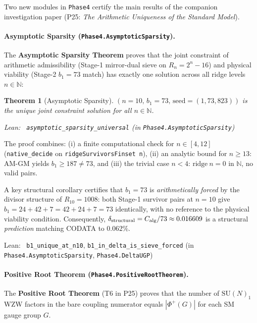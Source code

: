 \documentclass[11pt,a4paper]{article}
\newenvironment{leanref}%
  {\par\smallskip\noindent\begingroup\raggedright\textup{Lean:}~}%
  {\par\endgroup}
\newtheorem{theorem}{Theorem}[section]
\theoremstyle{definition}
\begin{document}
Two new modules in \texttt{Phase4} certify the main results of the
companion investigation paper (P25: \emph{The Arithmetic Uniqueness
of the Standard Model}).

\paragraph{Asymptotic Sparsity (\texttt{Phase4.AsymptoticSparsity}).}
The \textbf{Asymptotic Sparsity Theorem} proves that the joint constraint
of arithmetic admissibility (Stage-1 mirror-dual sieve on $R_n = 2^n - 16$)
and physical viability (Stage-2 $b_1 = 73$ match) has exactly one solution
across all ridge levels $n \in \mathbb{N}$:

\begin{theorem}[Asymptotic Sparsity]\label{thm:sparsity}
$(n{=}10,\, b_1{=}73,\, \mathrm{seed} = (1,73,823))$ is the unique joint
constraint solution for all $n \in \mathbb{N}$.
\begin{leanref} \lstinline|asymptotic_sparsity_universal|
\textup{(in \texttt{Phase4.AsymptoticSparsity})}
\end{leanref}
\end{theorem}

The proof combines:
(i) a finite computational check for $n \in [4,12]$
(\texttt{native\_decide} on \texttt{ridgeSurvivorsFinset~n}),
(ii) an analytic bound for $n \ge 13$: AM-GM yields $b_1 \ge 187 \ne 73$, and
(iii) the trivial case $n < 4$: $\mathrm{ridge}~n = 0$ in $\mathbb{N}$, no valid pairs.

A key structural corollary certifies that $b_1 = 73$ is \emph{arithmetically forced}
by the divisor structure of $R_{10} = 1008$: both Stage-1 survivor pairs at $n = 10$
give $b_1 = 24+42+7 = 42+24+7 = 73$ identically, with no reference to the physical
viability condition.  Consequently, $\delta_{\rm structural} = C_{\rm alg}/73 \approx 0.016609$
is a structural \emph{prediction} matching CODATA to $0.062\%$.

\begin{leanref} \lstinline|b1_unique_at_n10|, \lstinline|b1_in_delta_is_sieve_forced|
\textup{(in \texttt{Phase4.AsymptoticSparsity}, \texttt{Phase4.DeltaUGP})}
\end{leanref}

\paragraph{Positive Root Theorem (\texttt{Phase4.PositiveRootTheorem}).}
The \textbf{Positive Root Theorem} (T6 in P25) proves that the number of
$\mathrm{SU}(N)_1$ WZW factors in the bare coupling numerator equals
$|\Phi^+(G)|$ for each SM gauge group $G$.
\end{document}
